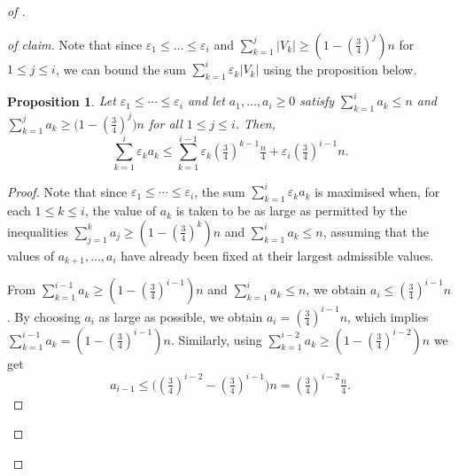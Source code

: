 \documentclass[10pt,a4paper]{amsart}
\newtheorem{prop}{Proposition}
\newcommand{\eps}{\varepsilon}
\begin{document}
\begin{proof}[ of ]
\begin{proof}[ of claim]
Note that since $\eps_1 \le \ldots \le \eps_i$ and $\sum_{k = 1}^j |V_k| \ge (1 - \left(\frac{3}{4}\right)^j)n$ for $1 \le j \le i$, we can bound the sum $\sum_{k=1}^i \eps_k|V_k|$ using the proposition below. 

\begin{prop}\label{prop:weighted-sum-bound}
Let $\eps_1\le \cdots \le \eps_i$ and let $a_1,\ldots,a_i\ge 0$ satisfy $\sum_{k=1}^i a_k \le n$ and
$\sum_{k=1}^j a_k \ge \big(1-(\tfrac34)^j\big)n$ for all $1\le j\le i$.
Then,
\[
\sum_{k=1}^i \eps_k a_k
\le
\sum_{k=1}^{i-1}
\eps_k(\tfrac34)^{k-1}\tfrac n4
+\eps_i(\tfrac34)^{i-1}n .
\]
\end{prop}

\begin{proof}
Note that since $\eps_1\le\cdots\le\eps_i$, the sum 
$\sum_{k=1}^i \eps_k a_k$ 
is maximised when, for each $1\le k\le i$, the value of $a_k$ is taken to be as large 
as permitted by the inequalities 
$\sum_{j=1}^k a_j \ge (1-(\tfrac34)^k)n$ and $\sum_{k=1}^ia_k \le n$, 
assuming that the values of $a_{k+1},\ldots,a_i$ have already been fixed at their 
largest admissible values.

From $\sum_{k=1}^{i-1} a_k \ge (1-(\tfrac34)^{i-1})n$ and $\sum_{k=1}^i a_k \le n$, we obtain
$a_i \le (\tfrac34)^{i-1}n$. By choosing $a_i$ as large as possible, we obtain $a_i = (\tfrac34)^{i-1}n$, which implies $\sum_{k=1}^{i-1}a_k = (1 - (\tfrac34)^{i-1})n$.
Similarly, using
$\sum_{k=1}^{i-2} a_k \ge (1-(\tfrac34)^{i-2})n$ we get
\[
a_{i-1}
\le
\big((\tfrac34)^{i-2}-(\tfrac34)^{i-1}\big)n
=
(\tfrac34)^{i-2}\tfrac n4 .
\]


\end{proof}
\end{proof}
\end{proof}
\end{document}

